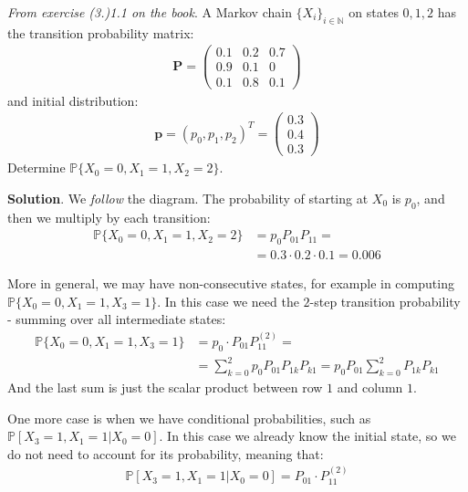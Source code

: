 \documentclass[../template.tex]{subfiles}
\begin{document}
\begin{example}\label{ex:1}
\textit{From exercise (3.)1.1 on the book}.
A Markov chain $\{X_i\}_{i\in \mathbb{N}}$ on states $0, 1, 2$ has the transition probability matrix:
\begin{align*}
    \textbf{P} = \left(\begin{array}{ccc}
    0.1 & 0.2 & 0.7 \\ 
    0.9 & 0.1 & 0 \\ 
    0.1 & 0.8 & 0.1
    \end{array}\right) 
\end{align*}
and initial distribution:
\begin{align*}
    \bm{p} = (p_0,p_1,p_2)^T =  \left(\begin{array}{c}
    0.3 \\ 
    0.4 \\ 
    0.3
    \end{array}\right)
\end{align*}
Determine $\mathbb{P}\{X_0 = 0, X_1=1, X_2=2\}$.

\medskip

\textbf{Solution}. We \textit{follow} the diagram. The probability of starting at $X_0$ is $p_0$, and then we multiply by each transition:
\begin{align*}
    \mathbb{P}\{X_0 = 0, X_1=1, X_2=2\} &= p_0 P_{01} P_{11} = \\
    &= 0.3 \cdot 0.2 \cdot 0.1 = 0.006
\end{align*} 

More in general, we may have non-consecutive states, for example in computing $\mathbb{P}\{X_0 = 0, X_1=1, X_3=1\}$. In this case we need the $2$-step transition probability - summing over all intermediate states:
\begin{align*}
    \mathbb{P}\{X_0 = 0, X_1=1, X_3=1\} &= p_0 \cdot P_{01} P_{11}^{(2)} =\\
    &= \sum_{k=0}^2 p_0 P_{01} P_{1k} P_{k1} = p_0 P_{01} \sum_{k=0}^2 P_{1k}P_{k1}
\end{align*} 
And the last sum is just the scalar product between row $1$ and column $1$.

\medskip

One more case is when we have conditional probabilities, such as $\mathbb{P}[X_3=1, X_1=1|X_0=0]$. In this case we already know the initial state, so we do not need to account for its probability, meaning that:
\begin{align*}
    \mathbb{P}[X_3=1, X_1=1|X_0=0] = P_{01} \cdot P_{11}^{(2)}
\end{align*}
\end{example}
\end{document}
